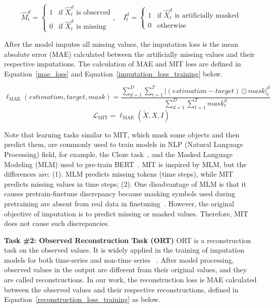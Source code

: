 \documentclass{article}
\begin{document}
\begin{equation*}
	\hat{M}_t^d = \left\{\begin{array}{ll}
		1 & \text{if } \hat{X}_t^d \text{ is observed} \\
		0 & \text{if } \hat{X}_t^d \text{ is missing}
	\end{array}\right.,
	\hspace{1em}
	I_t^d = \left\{\begin{array}{ll}
		1 & \text{if } \hat{X}_t^d \text{ is artificially masked} \\
		0 & \text{otherwise}
	\end{array}\right. 
\end{equation*}

After the model imputes all missing values, the imputation loss is the mean absolute error (MAE) calculated between the artificially missing values and their respective imputations. The calculation of MAE and MIT loss are defined in Equation~\ref{mae_loss} and Equation~\ref{imputation_loss_training} below.

\begin{equation}
	\label{mae_loss}
	\ell_{\text{MAE}}\left(estimation, target, mask \right) = \frac{\sum_{d=1}^D \sum_{t=1}^T \lvert \left(estimation - target \right)\odot mask\rvert_t^d}{\sum_{d=1}^D \sum_{t=1}^T mask_t^d}
\end{equation}
\begin{equation}
	\label{imputation_loss_training}
	\mathcal{L}_\text{MIT} = \ell_{\text{MAE}}\left(\tilde{X}, X, I\right) 
\end{equation}

Note that learning tasks similar to MIT, which mask some objects and then predict them, are commonly used to train models in NLP (Natural Language Processing) field, for example, the Cloze task~\cite{Taylor1953ClozeTask}, and the Masked Language Modeling (MLM) used to pre-train BERT~\cite{Devlin2019BERT}. MIT is inspired by MLM, but the differences are: (1). MLM predicts missing tokens (time steps), while MIT predicts missing values in time steps; (2). One disadvantage of MLM is that it causes pretrain-finetune discrepancy because masking symbols used during pretraining are absent from real data in finetuning~\cite{Yang2019XLNet}. However, the original objective of imputation is to predict missing or masked values. Therefore, MIT does not cause such discrepancies. 

\textbf{Task \#2: Observed Reconstruction Task (ORT)} \hspace{1em}
ORT is a reconstruction task on the observed values. It is widely applied in the training of imputation models for both time-series and non-time series ~\cite{Cao2018BRITS,Luo2018GRUI,Luo2019E2GAN,Fortuin2020GPVAE,Yoon2018GAIN,Li2018MisGAN}. After model processing, observed values in the output are different from their original values, and they are called reconstructions. In our work, the reconstruction loss is MAE calculated between the observed values and their respective reconstructions, defined in Equation~\ref{reconstruction_loss_training} as below.
\end{document}
